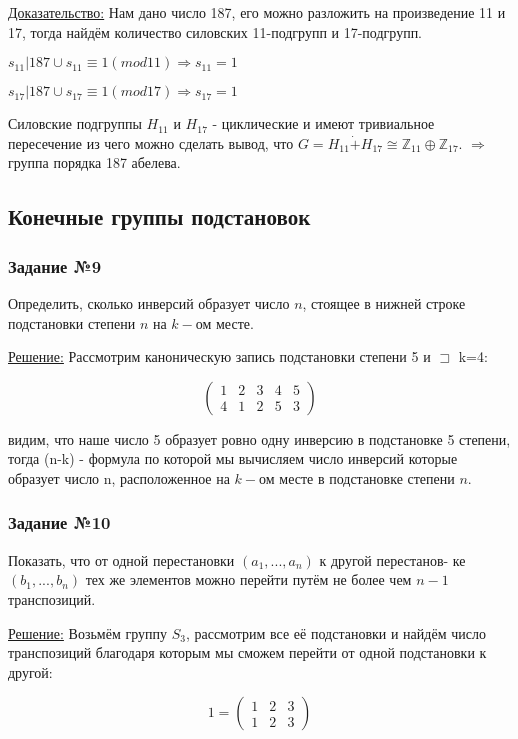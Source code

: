 \documentclass[utf8,14pt,a4paper,oneside,russian]{book}
\begin{document}
	\underline{Доказательство:} Нам дано число 187, его можно разложить на произведение 11 и 17, тогда найдём количество силовских 11-подгрупп и 17-подгрупп.
	
	$s_{11}|187 \cup s_{11}\equiv1(mod11)\Rightarrow s_{11}=1$
	
	$s_{17}|187 \cup s_{17}\equiv1(mod17)\Rightarrow s_{17}=1$
	
	Силовские подгруппы $H_{11}$ и $H_{17}$ - циклические и имеют тривиальное пересечение из чего можно сделать вывод, что $G=H_{11}\dot{+}H_{17}\cong \mathbb Z_{11} \oplus \mathbb Z_{17}$. $\Rightarrow$ группа порядка 187 абелева.
	
	\newpage
	
	\subsection{Конечные группы подстановок}
	\subsubsection{Задание №9}
	Определить, сколько инверсий образует число $n$, стоящее в нижней строке подстановки степени $n$ на $k-$ом месте.
	
	\underline{Решение:} Рассмотрим каноническую запись подстановки степени 5 и $\sqsupset$ k=4:
	
	\[ \left( 
	\begin{array}{cccccc}
	1&2&3&4&5\\
	4&1&2&5&3
	\end{array} 
	\right) \]
	
	видим, что наше число 5 образует ровно одну инверсию в подстановке 5 степени, тогда (n-k) - формула по которой мы вычисляем число инверсий которые образует число n, расположенное на $k-$ом месте в подстановке степени $n$. 
	
	\subsubsection{Задание №10}
	Показать, что от одной перестановки $(a_{1},...,a_{n})$ к другой перестанов-
	ке $(b_{1},...,b_{n})$ тех же элементов можно перейти путём не более чем $n-1$
	транспозиций.
	
	\underline{Решение:} Возьмём группу $S_{3}$, рассмотрим все её подстановки и найдём число транспозиций благодаря которым мы сможем перейти от одной подстановки к другой:
	
	\[ 1 = \left( 
	\begin{array}{ccc}
	1&2&3\\
	1&2&3
	\end{array} 
	\right)\]
	
\end{document}
